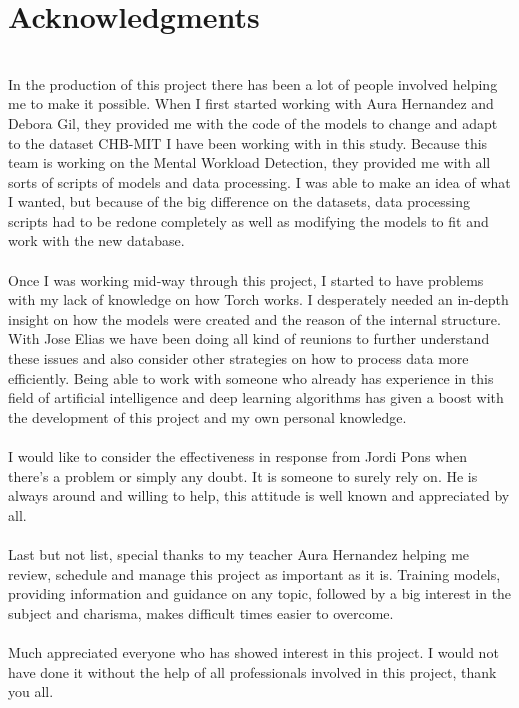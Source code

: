 \section{Acknowledgments}
\leavevmode\\
In the production of this project there has been a lot of people involved helping me to make it possible. When I first started working with Aura Hernandez and Debora Gil, they provided me with the code of the models to change and adapt to the dataset CHB-MIT I have been working with in this study. Because this team is working on the Mental Workload Detection, they provided me with all sorts of scripts of models and data processing. I was able to make an idea of what I wanted, but because of the big difference on the datasets, data processing scripts had to be redone completely as well as modifying the models to fit and work with the new database.
\\\\
Once I was working mid-way through this project, I started to have problems with my lack of knowledge on how Torch works. I desperately needed an in-depth insight on how the models were created and the reason of the internal structure. With Jose Elias we have been doing all kind of reunions to further understand these issues and also consider other strategies on how to process data more efficiently. Being able to work with someone who already has experience in this field of artificial intelligence and deep learning algorithms has given a boost with the development of this project and my own personal knowledge.
\\\\
I would like to consider the effectiveness in response from Jordi Pons when there’s a problem or simply any doubt. It is someone to surely rely on. He is always around and willing to help, this attitude is well known and appreciated by all.
\\\\
Last but not list, special thanks to my teacher Aura Hernandez helping me review, schedule and manage this project as important as it is. Training models, providing information and guidance on any topic, followed by a big interest in the subject and charisma, makes difficult times easier to overcome.
\\\\
Much appreciated everyone who has showed interest in this project. I would not have done it without the help of all professionals involved in this project, thank you all.
\\